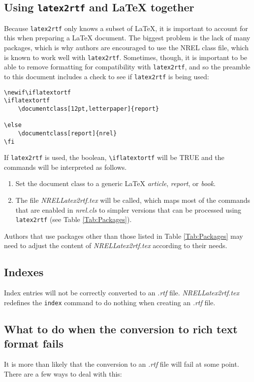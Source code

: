 \subsection{Using \texttt{latex2rtf} and LaTeX together}
Because \texttt{latex2rtf} only knows a subset of LaTeX, it is important to account for this when preparing a LaTeX document. The biggest problem is the lack of many packages, which is why authors are encouraged to use the NREL class file, which is known to work well with \texttt{latex2rtf}. Sometimes, though, it is important to be able to remove formatting for compatibility with \texttt{latex2rtf}, and so the preamble to this document includes a check to see if \texttt{latex2rtf} is being used:

\begin{verbatim}
\newif\iflatextortf
\iflatextortf
	\documentclass[12pt,letterpaper]{report}
	
\else
	\documentclass[report]{nrel} 
\fi
\end{verbatim}

If \texttt{latex2rtf} is used, the boolean, \texttt{\textbackslash iflatextortf} will be TRUE and the commands will be interpreted as follows.
\begin{enumerate}
\item Set the document class to a generic LaTeX{} \emph{article}, \emph{report}, or \emph{book}. 
\item The file \emph{NRELLatex2rtf.tex} will be called, which maps most of the commands that are enabled in \emph{nrel.cls} to simpler versions that can be processed using \texttt{latex2rtf} (see Table \ref{Tab:Packages}).
\end{enumerate}

Authors that use packages other than those listed in Table \ref{Tab:Packages} may need to adjust the content of \emph{NRELLatex2rtf.tex} according to their needs. 

\subsection{Indexes}
Index entries will not be correctly converted to an \emph{.rtf} file. \emph{NRELLatex2rtf.tex} redefines the \verb+index+ command to do nothing when creating an \emph{.rtf} file. 

\subsection{What to do when the conversion to rich text format fails}
It is more than likely that the conversion to an \emph{.rtf} file will fail at some point. There are a few ways to deal with this:

